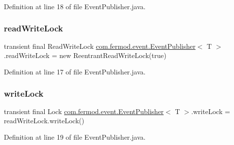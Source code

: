 Definition at line 18 of file Event\+Publisher.\+java.

\mbox{\label{classcom_1_1fermod_1_1event_1_1EventPublisher_a8acd43d374144fe2d44d67cd59e820fa}} 
\subsubsection{\texorpdfstring{readWriteLock}{readWriteLock}}
{\footnotesize\ttfamily transient final Read\+Write\+Lock \mbox{\hyperlink{classcom_1_1fermod_1_1event_1_1EventPublisher}{com.\+fermod.\+event.\+Event\+Publisher}}$<$ T $>$.read\+Write\+Lock = new Reentrant\+Read\+Write\+Lock(true)\hspace{0.3cm}{\ttfamily [private]}}



Definition at line 17 of file Event\+Publisher.\+java.

\mbox{\label{classcom_1_1fermod_1_1event_1_1EventPublisher_acde65c6b2ab5a8b71066b1fa20254cf7}} 
\subsubsection{\texorpdfstring{writeLock}{writeLock}}
{\footnotesize\ttfamily transient final Lock \mbox{\hyperlink{classcom_1_1fermod_1_1event_1_1EventPublisher}{com.\+fermod.\+event.\+Event\+Publisher}}$<$ T $>$.write\+Lock = read\+Write\+Lock.\+write\+Lock()\hspace{0.3cm}{\ttfamily [protected]}}



Definition at line 19 of file Event\+Publisher.\+java.

